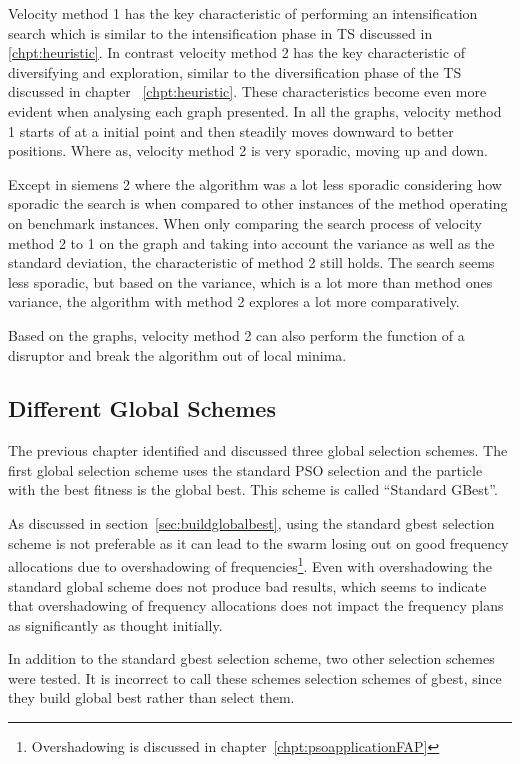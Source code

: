 Velocity method 1 has the key characteristic of performing an intensification search which is similar to the intensification phase in \gls{TS} discussed in \ref{chpt:heuristic}. In contrast velocity method 2 has the key characteristic of diversifying and exploration, similar to the diversification phase of the \gls{TS} discussed in chapter ~\ref{chpt:heuristic}. These characteristics become even more evident when analysing each graph presented. In all the graphs, velocity method 1 starts of at a initial point and then steadily moves downward to better positions. Where as, velocity method 2 is very sporadic, moving up and down. 

Except in siemens 2 where the algorithm was a lot less sporadic considering how sporadic the search is when compared to other instances of the method operating on benchmark instances. When only comparing the search process of velocity method 2 to 1 on the graph and taking into account the variance as well as the standard deviation, the characteristic of method 2 still holds. The search seems less sporadic, but based on the variance, which is a lot more than method ones variance, the algorithm with method 2 explores a lot more comparatively.

Based on the graphs, velocity method 2 can also perform the function of a disruptor and break the algorithm out of local minima.

\subsection{Different Global Schemes}
\label{sec:diffglobalschemes}
The previous chapter identified and discussed three global selection schemes. The first global selection scheme uses the standard PSO selection and the particle with the best fitness is the global best. This scheme is called ``Standard GBest''.

As discussed in section~\ref{sec:buildglobalbest}, using the standard gbest selection scheme is not preferable as it can lead to the swarm losing out on good frequency allocations due to overshadowing of frequencies\footnote{Overshadowing is discussed in chapter~\ref{chpt:psoapplicationFAP}}.
Even with overshadowing the standard global scheme does not produce bad results, which seems to indicate that overshadowing of frequency allocations does not impact the frequency plans as significantly as thought initially.

In addition to the standard gbest selection scheme, two other selection schemes were tested. It is incorrect to call these schemes selection schemes of gbest, since they build global best rather than select them.

